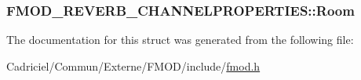 \hypertarget{struct_f_m_o_d___r_e_v_e_r_b___c_h_a_n_n_e_l_p_r_o_p_e_r_t_i_e_s_a4c5a73c7a00690a7e25d3b4ab50c6cc6}{
\subsubsection[{Room}]{ F\-M\-O\-D\-\_\-\-R\-E\-V\-E\-R\-B\-\_\-\-C\-H\-A\-N\-N\-E\-L\-P\-R\-O\-P\-E\-R\-T\-I\-E\-S\-::\-Room}}\label{struct_f_m_o_d___r_e_v_e_r_b___c_h_a_n_n_e_l_p_r_o_p_e_r_t_i_e_s_a4c5a73c7a00690a7e25d3b4ab50c6cc6}


The documentation for this struct was generated from the following file\-:\begin{DoxyCompactItemize}
\item 
Cadriciel/\-Commun/\-Externe/\-F\-M\-O\-D/include/\hyperlink{fmod_8h}{fmod.\-h}\end{DoxyCompactItemize}
